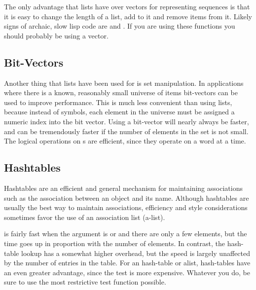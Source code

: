 The only advantage that lists have over vectors for representing
sequences is that it is easy to change the length of a list, add to it
and remove items from it.  Likely signs of archaic, slow lisp code are
 and .  If you are using these functions you
should probably be using a vector.


\subsection{Bit-Vectors}

Another thing that lists have been used for is set manipulation.  In
applications where there is a known, reasonably small universe of
items bit-vectors can be used to improve performance.  This is much
less convenient than using lists, because instead of symbols, each
element in the universe must be assigned a numeric index into the bit
vector.  Using a bit-vector will nearly always be faster, and can be
tremendously faster if the number of elements in the set is not small.
The logical operations on s are efficient,
since they operate on a word at a time.


\subsection{Hashtables}

Hashtables are an efficient and general mechanism for maintaining associations
such as the association between an object and its name.  Although hashtables
are usually the best way to maintain associations, efficiency and style
considerations sometimes favor the use of an association list (a-list).

 is fairly fast when the  argument is 
or  and there are only a few elements, but the time goes up
in proportion with the number of elements.  In contrast, the
hash-table lookup has a somewhat higher overhead, but the speed is
largely unaffected by the number of entries in the table.  For an
 hash-table or alist, hash-tables have an even greater
advantage, since the test is more expensive.  Whatever you do, be sure
to use the most restrictive test function possible.

